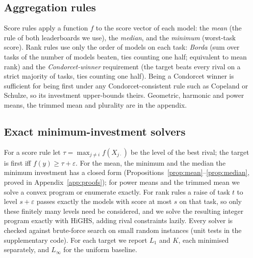 \documentclass{article}
\begin{document}
\subsection{Aggregation rules}
\label{sec:rules}
Score rules apply a function $f$ to the score vector of each model: the \emph{mean} (the rule of both leaderboards we use), the \emph{median}, and the \emph{minimum} (worst-task score). Rank rules use only the order of models on each task: \emph{Borda} (sum over tasks of the number of models beaten, ties counting one half; equivalent to mean rank) and the \emph{Condorcet-winner} requirement (the target beats every rival on a strict majority of tasks, ties counting one half). Being a Condorcet winner is sufficient for being first under any Condorcet-consistent rule such as Copeland or Schulze, so its investment upper-bounds theirs. Geometric, harmonic and power means, the trimmed mean and plurality are in the appendix.

\subsection{Exact minimum-investment solvers}
\label{sec:solvers}
For a score rule let $\tau=\max_{j\neq i} f(X_{j\cdot})$ be the level of the best rival; the target is first iff $f(y)\ge \tau+\varepsilon$. For the mean, the minimum and the median the minimum investment has a closed form (Propositions~\ref{prop:mean}--\ref{prop:median}, proved in Appendix~\ref{app:proofs}); for power means and the trimmed mean we solve a convex program or enumerate exactly. For rank rules a raise of task $t$ to level $s+\varepsilon$ passes exactly the models with score at most $s$ on that task, so only these finitely many levels need be considered, and we solve the resulting integer program exactly with HiGHS, adding rival constraints lazily. Every solver is checked against brute-force search on small random instances (unit tests in the supplementary code). For each target we report $L_1$ and $K$, each minimised separately, and $L_\infty$ for the uniform baseline.
\end{document}
